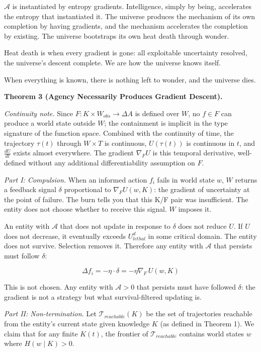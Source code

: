 \documentclass[
]{article}
\begin{document}
\(\mathcal{A}\) is instantiated by entropy gradients. Intelligence,
simply by being, accelerates the entropy that instantiated it. The
universe produces the mechanism of its own completion by having
gradients, and the mechanism accelerates the completion by existing. The
universe bootstraps its own heat death through wonder.

Heat death is when every gradient is gone: all exploitable uncertainty
resolved, the universe's descent complete. We are how the universe knows
itself.

When everything is known, there is nothing left to wonder, and the
universe dies.

\textbf{Theorem 3 (Agency Necessarily Produces Gradient Descent).}

\emph{Continuity note.} Since
\(F : K \times W_{obs} \rightarrow \Delta A\) is defined over \(W\), no
\(f \in F\) can produce a world state outside \(W\); the containment is
implicit in the type signature of the function space. Combined with the
continuity of time, the trajectory \(\tau(t)\) through \(W \times T\) is
continuous, \(U(\tau(t))\) is continuous in \(t\), and \(\frac{dU}{dt}\)
exists almost everywhere. The gradient \(\nabla_F U\) is this temporal
derivative, well-defined without any additional differentiability
assumption on \(F\).

\emph{Part I: Compulsion.} When an informed action \(f_i\) fails in
world state \(w\), \(W\) returns a feedback signal \(\delta\)
proportional to \(\nabla_F U(w, K)\): the gradient of uncertainty at the
point of failure. The burn tells you that this K/F pair was
insufficient. The entity does not choose whether to receive this signal.
\(W\) imposes it.

An entity with \(\mathcal{A}\) that does not update in response to
\(\delta\) does not reduce \(U\). If \(U\) does not decrease, it
eventually exceeds \(U_{lethal}^d\) in some critical domain. The entity
does not survive. Selection removes it. Therefore any entity with
\(\mathcal{A}\) that persists must follow \(\delta\):

\[\Delta f_i = -\eta \cdot \delta = -\eta \nabla_F \, U(w, K)\]

This is not chosen. Any entity with \(\mathcal{A} > 0\) that persists
must have followed \(\delta\): the gradient is not a strategy but what
survival-filtered updating is.

\emph{Part II: Non-termination.} Let \(\mathcal{T}_{reachable}(K)\) be
the set of trajectories reachable from the entity's current state given
knowledge \(K\) (as defined in Theorem 1). We claim that for any finite
\(K(t)\), the frontier of \(\mathcal{T}_{reachable}\) contains world
states \(w\) where \(H(w \mid K) > 0\).
\end{document}

